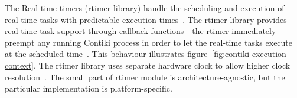 The Real-time timers (rtimer library) handle the scheduling and execution of
real-time tasks with predictable execution times~\cite{contiki-docs}.
The rtimer library provides real-time task support through callback functions -
the rtimer immediately preempt any running Contiki process in order to let the real-time tasks
execute at the scheduled time~\cite{contiki-wiki-timers}.
This behaviour illustrates figure~\ref{fig:contiki-execution-context}.
The rtimer library uses separate hardware clock
to allow higher clock resolution~\cite{contiki-wiki-timers}.
The small part of rtimer module is architecture-agnostic,
but the particular implementation is platform-specific.
